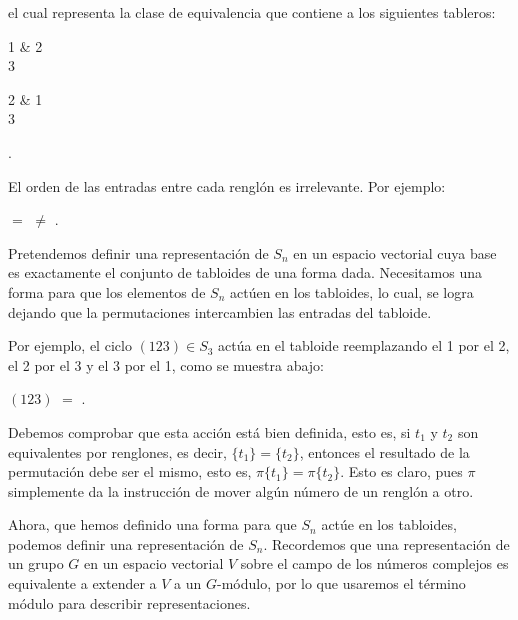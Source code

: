 \documentclass[12pt]{book}
\theoremstyle{definition}
\newcounter{in}
\newcounter{ini}
\begin{document}
\begin{center}
\end{center}

el cual representa la clase de equivalencia que contiene a los
siguientes tableros:
\begin{center}  
  \begin{ytableau}
    1 & 2  \\
    3
  \end{ytableau}\qquad
  \begin{ytableau}
    2 & 1  \\
    3
  \end{ytableau}\quad .
\end{center}

El orden de las entradas entre cada renglón es irrelevante. Por
ejemplo:

\begin{center}
  \quad$=$\quad
  \quad$\neq$\quad
  \quad .
\end{center}

Pretendemos definir una representación de $S_{n}$ en un espacio
vectorial cuya base es exactamente el conjunto de tabloides de una
forma dada. Necesitamos una forma para que los elementos de $S_{n}$
actúen en los tabloides, lo cual, se logra dejando que la permutaciones intercambien las entradas del
tabloide.

Por ejemplo, el ciclo $(123)\in S_{3}$ actúa en el tabloide
reemplazando el 1 por el 2, el 2 por el 3 y el 3 por el 1, como se
muestra abajo:
\begin{center}
  $(123)$
  \quad$=$\quad
  \quad .
\end{center}

Debemos comprobar que esta acción está bien definida, esto es, si $t_{1}$
y $t_{2}$ son equivalentes por renglones, es decir,
$\{t_{1}\}=\{t_{2}\}$, entonces el resultado de la permutación debe
ser el mismo, esto es, $\pi\{t_{1}\}=\pi\{t_{2}\}$. Esto es claro,
pues $\pi$ simplemente da la instrucción de mover algún número de un
renglón a otro.

Ahora, que hemos definido una forma para que $S_{n}$ actúe en los tabloides,
podemos definir una representación de $S_{n}$. Recordemos que una
representación de un grupo $G$ en un espacio vectorial $V$ sobre el
campo de los números complejos es equivalente a extender a $V$ a un $G$-módulo,
por lo que usaremos el término módulo para describir representaciones.
\end{document}
